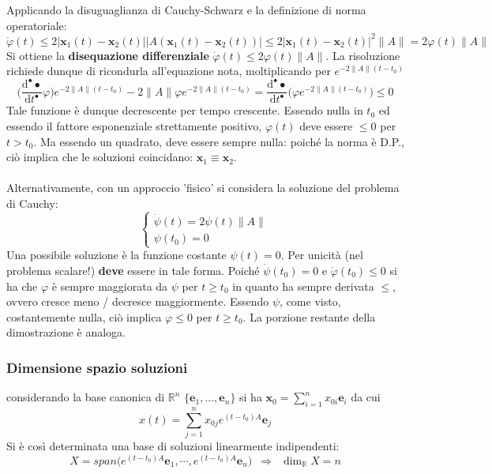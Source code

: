 \documentclass[10pt, oneside]{book}
\theoremstyle{plain}
\begin{document}
Applicando la disuguaglianza di Cauchy-Schwarz e la definizione di norma operatoriale: 
\[\dot{\varphi}(t) \leq 2 |\mathbf{x}_1(t) - \mathbf{x}_2(t)| |A(\mathbf{x}_1(t) - \mathbf{x}_2(t))| \leq 2 |\mathbf{x}_1(t) - \mathbf{x}_2(t)|^2 \|A\| = 2 \varphi(t) \|A\|\]
Si ottiene la \textbf{disequazione differenziale} $\displaystyle \dot{\varphi}(t) \leq 2 \varphi(t) \|A\|$. La risoluzione richiede dunque di ricondurla all'equazione nota, moltiplicando per $\displaystyle e^{-2\|A\|(t - t_0)}$
\[\big(\frac{\textrm{d}^{•} •}{\textrm{d}t^{•}}\varphi\big)e^{-2\|A\|(t - t_0)} - 2\|A\|\varphi e^{-2\|A\|(t - t_0)} = \frac{\textrm{d}^{•} •}{\textrm{d}t^{•}}\bigg(\varphi e^{-2\|A\|(t - t_0)}\bigg) \leq 0\]
Tale funzione è dunque decrescente per tempo crescente. Essendo nulla in $t_0$ ed essendo il fattore esponenziale strettamente positivo, $\varphi(t)$ deve essere $\leq 0$ per $t > t_0$. Ma essendo un quadrato, deve essere sempre nulla: poiché la norma è D.P., ciò implica che le soluzioni coincidano: $\mathbf{x}_1 \equiv \mathbf{x}_2$.
\\~\\Alternativamente, con un approccio 'fisico' si considera la soluzione del problema di Cauchy:
\[\begin{cases}
\dot{\psi}(t) = 2 \psi(t) \|A\| \\
\psi(t_0) = 0
\end{cases}\]
Una possibile soluzione è la funzione costante $\psi(t) = 0$. Per unicità (nel problema scalare!) \textbf{deve} essere in tale forma. Poiché $\dot{\psi}(t_0) = 0$ e $\dot{\varphi}(t_0) \leq 0$ si ha che $\varphi$ è sempre maggiorata da $\psi$ per $t \geq t_0$ in quanto ha sempre derivata $\leq$, ovvero cresce meno / decresce maggiormente. Essendo $\psi$, come visto, costantemente nulla, ciò implica $\varphi \leq 0$ per $t \geq t_0$. La porzione restante della dimostrazione è analoga.

\subsubsection*{Dimensione spazio soluzioni} considerando la base canonica di $\mathbb{R}^n$ $\{\mathbf{e}_1, ..., \mathbf{e}_n\}$ si ha $\displaystyle \mathbf{x}_0 = \sum\limits_{i=1}^n x_{0i}\mathbf{e}_i$ da cui
\[x(t) = \sum\limits_{j=1}^n x_{0j}e^{\displaystyle (t - t_0)A}\mathbf{e}_j\]
Si è così determinata una base di soluzioni linearmente indipendenti:
\[X = span\big(e^{\displaystyle (t - t_0)A}\mathbf{e}_1, \cdots, e^{\displaystyle (t - t_0)A}\mathbf{e}_n\big) \enspace \Rightarrow \enspace \dim_{\mathbb{R}}X = n\]
\end{document}
